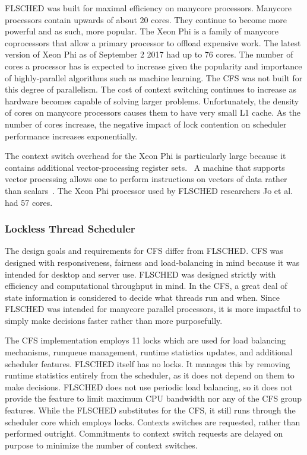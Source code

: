 \documentclass{sig-alternate}
\begin{document}
FLSCHED was built for maximal efficiency on manycore processors. Manycore processors contain upwards of about 20 cores. They continue to become more powerful and as such, more popular. The Xeon Phi is a family of manycore coprocessors that allow a primary processor to offload expensive work. The latest version of Xeon Phi as of September 2 2017 had up to 76 cores. The number of cores a processor has is expected to increase given the popularity and importance of highly-parallel algorithms such as machine learning. The CFS was not built for this degree of parallelism. The cost of context switching continues to increase as hardware becomes capable of solving larger problems. Unfortunately, the density of cores on manycore processors causes them to have very small L1 cache. As the number of cores increase, the negative impact of lock contention on scheduler performance increases exponentially.

The context switch overhead for the Xeon Phi is particularly large because it contains additional vector-processing register sets.~\cite{Jo:2017} A machine that supports vector processing allows one to perform instructions on vectors of data rather than scalars~\cite{Mellon}. The Xeon Phi processor used by FLSCHED researchers Jo et al. had 57 cores.~\cite{Jo:2017}

\subsubsection{Lockless Thread Scheduler}
\label{sec:flsched_about}

The design goals and requirements for CFS differ from FLSCHED. CFS was designed with responsiveness, fairness and load-balancing in mind because it was intended for desktop and server use. FLSCHED was designed strictly with efficiency and computational throughput in mind. In the CFS, a great deal of state information is considered to decide what threads run and when. Since FLSCHED was intended for manycore parallel processors, it is more impactful to simply make decisions faster rather than more purposefully.~\cite{Jo:2017}

The CFS implementation employs 11 locks which are used for load balancing mechanisms, runqueue management, runtime statistics updates, and additional scheduler features. FLSCHED itself has no locks. It manages this by removing runtime statistics entirely from the scheduler, as it does not depend on them to make decisions. FLSCHED does not use periodic load balancing, so it does not provide the feature to limit maximum CPU bandwidth nor any of the CFS group features. While the FLSCHED substitutes for the CFS, it still runs through the scheduler core which employs locks. Contexts switches are requested, rather than performed outright. Commitments to context switch requests are delayed on purpose to minimize the number of context switches.~\cite{Jo:2017}
\end{document}
